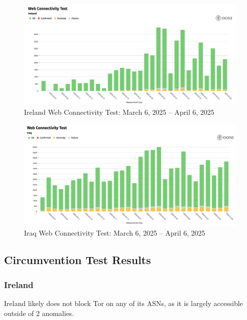 \begin{figure}[H]
    \centering
    \includegraphics[width=\textwidth]{Griff/TCD SCSS CAPSTONE/Results/IrelandWebsiteTest.png}
    \caption{Ireland Web Connectivity Test: March 6, 2025 -- April 6, 2025}
    \label{fig:iraq-middlebox-HTTP-manipulation}
\end{figure}

\begin{figure}[H]
    \centering
    \includegraphics[width=\textwidth]{Griff/TCD SCSS CAPSTONE/Results/IraqWebsiteTest.png}
    \caption{Iraq Web Connectivity Test: March 6, 2025 -- April 6, 2025}
    \label{fig:iraq-middlebox-HTTP-manipulation}
\end{figure}

\subsection{Circumvention Test Results}

\subsubsection{Ireland}

Ireland likely does not block Tor on any of its ASNs, as it is largely accessible outside of 2 anomalies.

